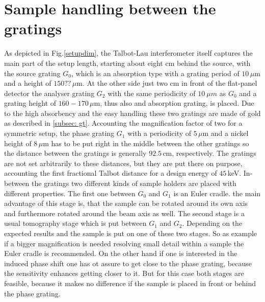 \section[Sample handling]{Sample handling between the gratings}\label{sec:samplehandling}
As depicted in Fig.\ref{setupdim}, the Talbot-Lau interferometer itself captures the main part of the setup length, starting about eight cm behind the source, with the source grating $G_{0}$, which is an absorption type with a grating period of $10\, \mu$m and a height of $150??\, \mu$m. At the other side just two cm in front of the flat-panel detector the analyser grating $G_{2}$ with the same periodicity of $10 \ \mu m$ as $G_{0}$ and a grating height of $160-170\, \mu$m, thus also and absorption grating, is placed. Due to the high absorbency and the easy handling these two gratings are made of gold as described in \ref{subsec: gt}. Accounting the magnification factor of two for a symmetric setup, the phase grating $G_{1}$ with a periodicity of $5\, \mu$m and a nickel height of $8\, \mu$m has to be put right in the middle between the other gratings so the distance between the gratings is generally $92.5\, $cm, respectively. The gratings are not set arbitrarily to these distances, but they are put there on purpose, accounting the first fractional Talbot distance for a design energy of $45\,$keV. In-between the gratings two different kinds of sample holders are placed with different properties. The first one between $G_{0}$ and $G_{1}$ is an Euler cradle. the main advantage of this stage is, that the sample can be rotated around its own axis and furthermore rotated around the beam axis as well. The second stage is a usual tomography stage which is put between $G_{1}$ and $G_{2}$. Depending on the expected results and the sample is put on one of these two stages. So as example if a bigger magnification is needed resolving small detail within a sample the Euler cradle is recommended. On the other hand if one is interested in the induced phase shift one has ot assure to get close to the phase grating, because the sensitivity enhances getting closer to it. But for this case both stages are feasible, because it makes no difference if the sample is placed in front or behind the phase grating. 
